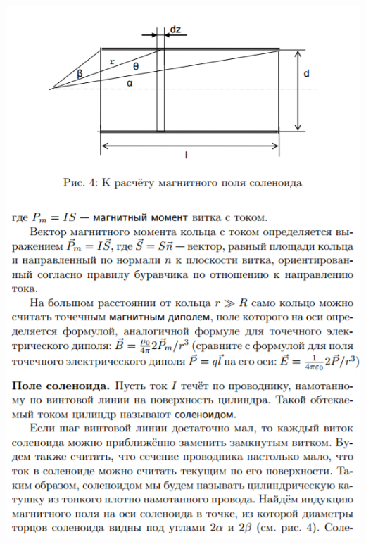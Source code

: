 \documentclass[12pt]{article}
\begin{document}
\begin{center}
       	\includegraphics[width=15cm]{theory5.png}

\end{center}
\end{document}
